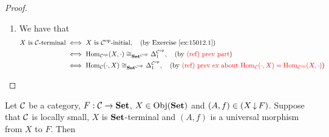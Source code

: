 \documentclass{book}
\begin{document}
\begin{proof}
\begin{enumerate}
\begin{itemize}
			\begin{align*}
				\phi_A 
				& \in \Iso_{\bSet}(F(A), \Del^{\MC}_1(A)) \\
				& = \Iso_{\bSet}(F(A), 1).
			\end{align*}
			Since $\Iso_{\bSet}(F(A), 1) \neq \varnothing$ and $1$ is $\bSet$-terminal, we have that  
			\begin{align*}
				\Hom_{\MC}(X, A) 
				& = F(A) \\
				& \cong_{\bSet} 1 \\
				& \cong_{\bSet} \{\varnothing\}, \quad \text{(by \rex{15015})}.
			\end{align*}
			Thus there exists $f \in \Hom_{\MC}(X, A)$ such that $\Hom_{\MC}(X, A) = \{f\}$. Since $A \in \Obj(\MX)$ is arbitrary, we have that for each $A \in \Obj(\MC)$, there exists $f \in \Hom_{\MC}(X, A)$ such that $\Hom_{\MC}(X, A) = \{f\}$. Hence $X$ is $\MC$-initial.
		\end{itemize}
		\item We have that 
		\begin{align*}
			\text{$X$ is $\MC$-terminal}
			& \iff \text{$X$ is $\op{\MC}$-initial}, \quad \text{(by \rex{15012.1})} \\
			& \iff \Hom_{\op{\MC}}(X, \cdot) \cong_{\bSet^{\op{\MC}}} \Del^{\op{\MC}}_1, \quad \text{(by \tcr{(ref) prev part})} \\
			& \iff \Hom_{\MC}(\cdot, X) \cong_{\bSet^{\op{\MC}}} \Del^{\op{\MC}}_1, \quad \text{(by \tcr{(ref) prev ex about $\Hom_{\MC}(\cdot, X) = \Hom_{\op{\MC}}(X, \cdot)$})}
		\end{align*}
	\end{enumerate}
\end{proof}

\begin{ex}
	Let $\MC$ be a category, $F:\mathcal{C} \rightarrow \text{\textbf{Set}}$, $X \in \operatorname{Obj}(\text{\textbf{Set}})$ and $(A, f) \in (X \operatorname{\downarrow} F)$. Suppose that $\MC$ is locally small, $X$ is $\bSet$-terminal and $(A,f)$ is a universal morphism from $X$ to $F$. Then 
\end{ex}













\end{document}
